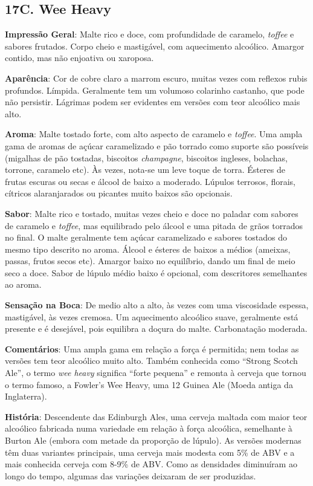 \subsection*{17C. Wee Heavy}

\textbf{Impressão Geral}: Malte rico e doce, com profundidade de caramelo, \textit{toffee} e sabores frutados. Corpo cheio e mastigável, com aquecimento alcoólico. Amargor contido, mas não enjoativa ou xaroposa.

\textbf{Aparência}: Cor de cobre claro a marrom escuro, muitas vezes com reflexos rubis profundos. Límpida. Geralmente tem um volumoso colarinho castanho, que pode não persistir. Lágrimas podem ser evidentes em versões com teor alcoólico mais alto.

\textbf{Aroma}: Malte tostado forte, com alto aspecto de caramelo e \textit{toffee}. Uma ampla gama de aromas de açúcar caramelizado e pão torrado como suporte são possíveis (migalhas de pão tostadas, biscoitos \textit{champagne}, biscoitos ingleses, bolachas, torrone, caramelo etc). Às vezes, nota-se um leve toque de torra. Ésteres de frutas escuras ou secas e álcool de baixo a moderado. Lúpulos terrosos, florais, cítricos alaranjarados ou picantes muito baixos são opcionais.

\textbf{Sabor}: Malte rico e tostado, muitas vezes cheio e doce no paladar com sabores de caramelo e \textit{toffee}, mas equilibrado pelo álcool e uma pitada de grãos torrados no final. O malte geralmente tem açúcar caramelizado e sabores tostados do mesmo tipo descrito no aroma. Álcool e ésteres de baixos a médios (ameixas, passas, frutos secos etc). Amargor baixo no equilíbrio, dando um final de meio seco a doce. Sabor de lúpulo médio baixo é opcional, com descritores semelhantes ao aroma.

\textbf{Sensação na Boca}: De medio alto a alto, às vezes com uma viscosidade espessa, mastigável, às vezes cremosa. Um aquecimento alcoólico suave, geralmente está presente e é desejável, pois equilibra a doçura do malte. Carbonatação moderada.

\textbf{Comentários}: Uma ampla gama em relação a força é permitida; nem todas as versões tem teor alcoólico muito alto. Também conhecida como “Strong Scotch Ale”, o termo \textit{wee heavy} significa “forte pequena” e remonta à cerveja que tornou o termo famoso, a Fowler’s Wee Heavy, uma 12 Guinea Ale (Moeda antiga da Inglaterra).

\textbf{História}: Descendente das Edinburgh Ales, uma cerveja maltada com maior teor alcoólico fabricada numa variedade em relação à força alcoólica, semelhante à Burton Ale (embora com metade da proporção de lúpulo). As versões modernas têm duas variantes principais, uma cerveja mais modesta com 5\% de ABV e a mais conhecida cerveja com 8-9\% de ABV. Como as densidades diminuíram ao longo do tempo, algumas das variações deixaram de ser produzidas.

